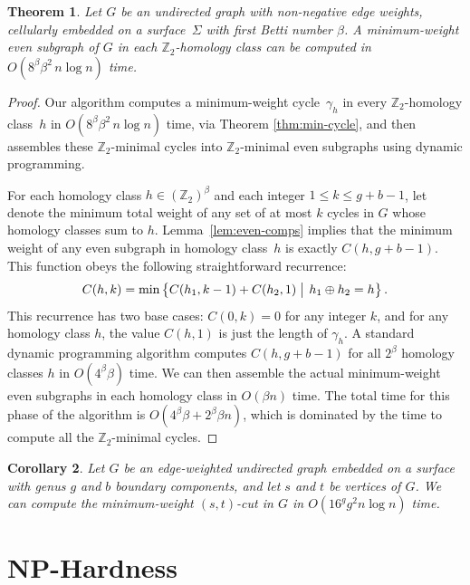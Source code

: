 \documentclass[11pt,twoside]{article}
\def\Z{\mathbb{Z}}
\newtheorem{theorem}{Theorem}[section]
\newtheorem{corollary}[theorem]{Corollary}
\begin{document}
{\begin{theorem}
\label{thm:min-even}
Let $G$ be an undirected graph with non-negative edge weights, cellularly embedded on a surface~$\Sigma$ with first Betti number $\beta$.  A minimum-weight even subgraph of $G$ in each $\Z_2$-homology class can be computed in $O(8^\beta \beta^2\, n\log n)$ time.
\end{theorem}

\begin{proof}
Our algorithm computes a minimum-weight cycle~$\gamma_h$ in every $\Z_2$-homology class~$h$ in $O(8^\beta \beta^2\, n\log n)$ time, via Theorem \ref{thm:min-cycle}, and then assembles these $\Z_2$-minimal cycles into $\Z_2$-minimal even subgraphs using dynamic programming.

For each homology class $h\in (\Z_2)^\beta$ and each integer $1\le k\le g+b-1$, let  denote the minimum total weight of any set of at most $k$ cycles in $G$ whose homology classes sum to $h$.  Lemma~\ref{lem:even-comps} implies that the minimum weight of any even subgraph in homology class~$h$ is exactly $C(h, g+b-1)$.  This function obeys the following straightforward recurrence:
\[
	C(h,k) = \min\Setbar{C(h_1,k-1) + C(h_2, 1)\strut}{h_1\oplus h_2 = h}.
\]
This recurrence has two base cases: $C(0, k) = 0$ for any integer $k$, and for any homology class $h$, the value $C(h,1)$ is just the length of $\gamma_h$.  A standard dynamic programming algorithm computes $C(h, g+b-1)$ for all $2^\beta$ homology classes $h$ in $O(4^\beta \beta)$ time.  We can then assemble the actual minimum-weight even subgraphs in each homology class in $O(\beta n)$ time.  The total time for this phase of the algorithm is $O(4^\beta \beta + 2^\beta \beta n)$, which is dominated by the time to compute all the $\Z_2$-minimal cycles.
\end{proof}

\begin{corollary}
\label{cor:mincut}
Let $G$ be an edge-weighted undirected graph embedded on a surface with genus $g$ and $b$ boundary components, and let $s$ and $t$ be vertices of $G$.  We can compute the minimum-weight $(s,t)$-cut in $G$ in $O(16^g g^2 n \log n)$ time.
\end{corollary}

\section{{NP}-Hardness}
\label{S:NPhard}

}
\end{document}

